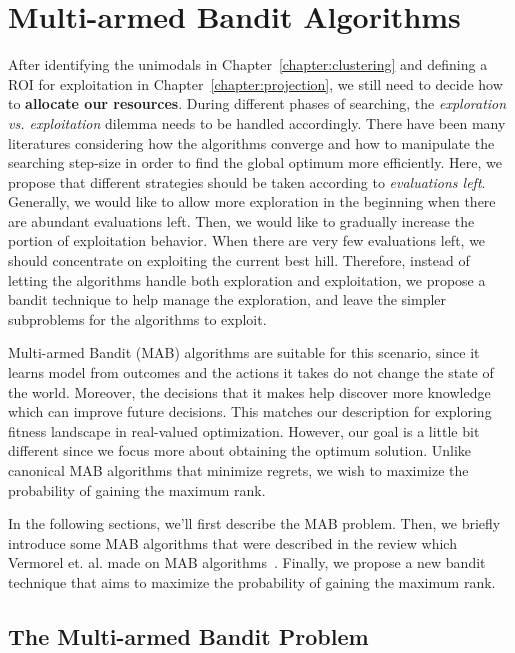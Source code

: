 \chapter{Multi-armed Bandit Algorithms}
\label{chapter:MAB}

After identifying the unimodals in Chapter~\ref{chapter:clustering} and defining a ROI for exploitation in Chapter~\ref{chapter:projection},
we still need to decide how to \textbf{allocate our resources}.
During different phases of searching, the \textit{exploration vs. exploitation} dilemma needs to be handled accordingly.
There have been many literatures considering how the algorithms converge 
and how to manipulate the searching step-size in order to find the global optimum more efficiently.
Here, we propose that different strategies should be taken according to \textit{evaluations left}.
Generally, we would like to allow more exploration in the beginning when there are abundant evaluations left.
Then, we would like to gradually increase the portion of exploitation behavior.
When there are very few evaluations left, we should concentrate on exploiting the current best hill.
Therefore, instead of letting the algorithms handle both exploration and exploitation, we propose a bandit technique to help manage the exploration, and leave the simpler subproblems for the algorithms to exploit.

Multi-armed Bandit (MAB) algorithms are suitable for this scenario, 
since it learns model from outcomes and the actions it takes do not change the state of the world.
Moreover, the decisions that it makes help discover more knowledge which can improve future decisions.
This matches our description for exploring fitness landscape in real-valued optimization.
However, our goal is a little bit different since we focus more about obtaining the optimum solution.
Unlike canonical MAB algorithms that minimize regrets, we wish to maximize the probability of gaining the maximum rank.

In the following sections, we'll first describe the MAB problem.
Then, we briefly introduce some MAB algorithms 
that were described in the review which Vermorel et. al. made on MAB algorithms~\cite{Vermorel:2005:MAB}.
Finally, we propose a new bandit technique that aims to maximize the probability of gaining the maximum rank.


\section{The Multi-armed Bandit Problem}

